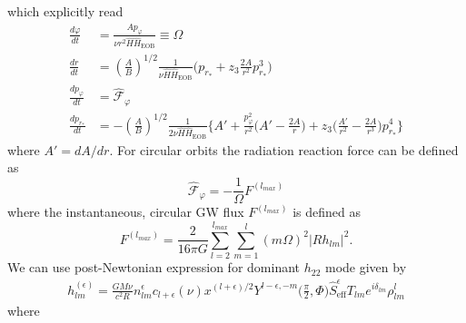 \documentclass[prd,preprintnumbers,onecolumn,eqsecnum,floatfix,letter]{revtex4}
\begin{document}
which explicitly read
\begin{align}
\frac{d\varphi}{dt} &= \frac{A p_{\varphi}}{\nu r^2 \hat{H}\hat{H}_{\text{EOB}}} \equiv \Omega\\
\frac{dr}{dt} &=\left(\frac{A}{B}\right)^{1/2}\frac{1}{\nu\hat{H}\hat{H}_{\text{EOB}}}\Bigg(p_{r_*} + z_{3}\frac{2A}{r^2}p_{r_*}^3\Bigg)\\
\frac{dp_{\varphi}}{dt} &=\hat{\mathscr{F}}_{\varphi}\\
\frac{dp_{r_*}}{dt} &=-\left(\frac{A}{B}\right)^{1/2}\frac{1}{2\nu\hat{H}\hat{H}_{\text{EOB}}}\Bigg\{A' + \frac{p_{\varphi}^2}{r^2}\Bigg(A'- \frac{2A}{r}\Bigg) + z_3\Bigg(\frac{A'}{r^2}- \frac{2A}{r^3}\Bigg)p_{r_*}^4\Bigg\}
\end{align}
where $A' = dA/dr$. For circular orbits the radiation reaction force can be defined as
\begin{equation}
	\hat{\mathscr{F}}_{\varphi} = -\frac{1}{\Omega}F^{(l_{max})}
\end{equation}
where the instantaneous, circular GW flux $F^{(l_{max})}$ is defined as
\begin{equation}
	F^{(l_{max})} = \frac{2}{16\pi G}\sum_{l=2}^{l_{max}}\sum_{m=1}^{l}\left(m\Omega\right)^{2} |Rh_{lm}|^2.
\end{equation}
We can use post-Newtonian expression for dominant $h_{22}$ mode given by
\begin{align}
	h_{lm}^{\left(\epsilon\right)} = \frac{GM\nu}{c^2 R}n_{lm}^{\epsilon}c_{l+\epsilon}\left(\nu\right)x^{\left(l+\epsilon\right)/2}Y^{l-\epsilon,-m}\bigg(\frac{\pi}{2}, \Phi\bigg)\hat{S}_{\text{eff}}^{\epsilon}T_{lm}e^{i\delta_{lm}}\rho_{lm}^l
\end{align}
where
\end{document}
